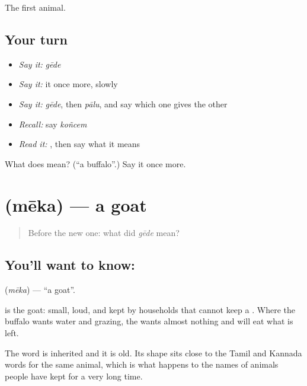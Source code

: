 \begin{grammarlens}[title={What you've built}]
The first animal.
\end{grammarlens}

\subsection*{Your turn}
\begin{itemize}
\raggedright
  \item \emph{Say it:} \emph{gēde}
  \item \emph{Say it:} it once more, slowly
  \item \emph{Say it:} \emph{gēde}, then \emph{pālu}, and say which one gives the other
  \item \emph{Recall:} say \emph{koñcem}
  \item \emph{Read it:} \textbf{}, then say what it means
\end{itemize}

\begin{tcolorbox}[breakable,colback=teal!4,colframe=teal!35!black,title={Before you move on}]
What does  mean? (\textquotedblleft{}a buffalo\textquotedblright{}.) Say it once more.
\end{tcolorbox}
\section[\texorpdfstring{\te{మేక} (mēka)}{మేక (mēka)}]{ (mēka) — a goat}

\label{lesson:TE-C60-goat}



\begin{quote}
Before the new one: what did \emph{gēde} mean?
\end{quote}

\subsection*{You'll want to know: }
\textbf{} (\emph{mēka}) — \textquotedblleft{}a goat\textquotedblright{}.

 is the goat: small, loud, and kept by households that cannot keep a . Where the buffalo wants water and grazing, the  wants almost nothing and will eat what is left.

The word is inherited and it is old. Its shape sits close to the Tamil and Kannada words for the same animal, which is what happens to the names of animals people have kept for a very long time.

